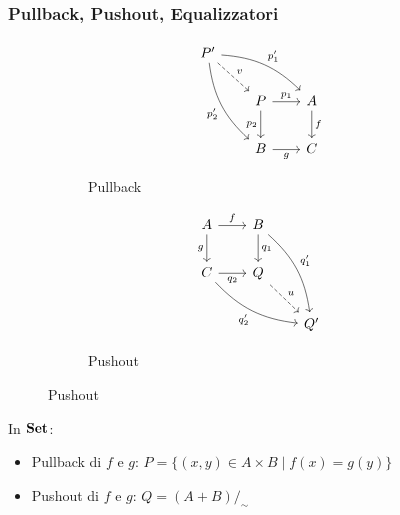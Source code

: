 \documentclass[8pt]{beamer}
\begin{document}
\begin{frame}[fragile]\frametitle{Pullback, Pushout, Equalizzatori}
	\begin{figure}[h]
		\begin{subfigure}{0.25\textwidth}
			\[\begin{tikzcd}[row sep = 20, column sep = 20]
				P' \arrow[dr, dashed, "v"] \arrow[drr, "{p_1'}", bend left=20] \arrow[ddr, "{p_2'}"swap, bend right=20] & & \\
 									& P \arrow[r, "{p_1}"] \arrow[d, "{p_2}"swap] 			& A \arrow[d, "f"] \\
									& B \arrow[r, "g"swap] 						& C
			\end{tikzcd}\]
			\caption{Pullback}
			\label{fig:pg}
		\end{subfigure}
		\qquad
		\begin{subfigure}{0.25\textwidth}
			\[\begin{tikzcd}[row sep = 20, column sep = 20]
				A \arrow[r, "f"] \arrow[d, "g"swap] 	& B \arrow[d, "{q_1}"] 	\arrow[ddr, "{q_1'}", bend left=20]	& \\
				C \arrow[r, "{q_2}"swap]  \arrow[drr, "{q_2'}"swap, bend right=20] & Q \arrow[dr, dashed, "u"] 	& \\
							& 				& Q'
			\end{tikzcd}\]
			\caption{Pushout}
			\label{po}
		\end{subfigure}
	\end{figure}

	In $\mathbf{Set}$:
	\begin{itemize}
		\item Pullback di $f$ e $g$: $ P = \{(x, y) \in A \times B \mid f(x) = g (y)\}$
		\item Pushout di $f$ e $g$:  $Q = (A + B)/_\sim$
	\end{itemize}
\end{frame}
\end{document}
